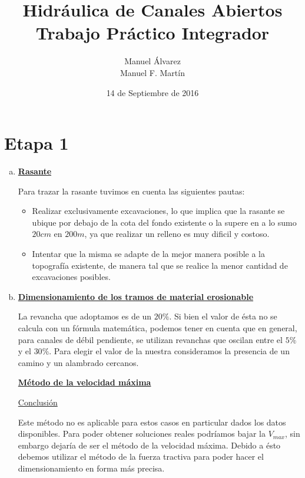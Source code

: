 \documentclass[10.5pt]{article}
\begin{document}
\date{14 de Septiembre de 2016}
\title{Hidráulica de Canales Abiertos\\Trabajo Práctico Integrador}
\author{Manuel Álvarez\\Manuel F. Martín}

\maketitle


\section*{Etapa 1}

\begin{enumerate}[a)]
 \item \underline{\bf Rasante}
 
 Para trazar la rasante tuvimos en cuenta las siguientes pautas:
  \begin{itemize}
   \item Realizar exclusivamente excavaciones, lo que implica que la rasante se ubique por debajo de la cota del fondo existente o la supere
   en a lo sumo $20 cm$ en $200 m$, ya que realizar un relleno es muy dificil y costoso.
   \item Intentar que la misma se adapte de la mejor manera posible a la topografía existente, de manera tal que se realice la menor cantidad
   de excavaciones posibles.
  \end{itemize}
  
 \item \underline{\bf Dimensionamiento de los tramos de material erosionable}
  
  La revancha que adoptamos es de un $20\%$. Si bien el valor de ésta no se calcula con un fórmula matemática, podemos tener en cuenta que 
  en general, para canales de débil pendiente, se utilizan revanchas que oscilan entre el $5\%$ y el $30\%$. Para elegir el valor de la nuestra
  consideramos la presencia de un camino y un alambrado cercanos.
    
  \underline{\bf Método de la velocidad máxima}
  
  
  
  
  
  \underline{Conclusión}
  
  Este método no es aplicable para estos casos en particular dados los datos disponibles.
  Para poder obtener soluciones reales podríamos bajar la $V_{max}$, sin embargo dejaría de ser el método de la velocidad máxima.
  Debido a ésto debemos utilizar el método de la fuerza tractiva para poder hacer el dimensionamiento en forma más precisa.
  

\end{enumerate}
\end{document}
